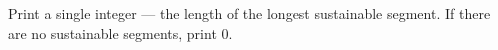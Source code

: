 Print a single integer --- the length of the longest sustainable segment. If there are no sustainable segments, print $0$.
